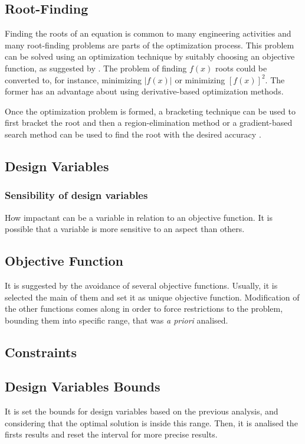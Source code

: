 \subsection{Root-Finding}
Finding the roots of an equation is common to many engineering activities and many root-finding problems are parts of the optimization process. This problem can be solved using an optimization technique by suitably choosing an objective function, as suggested by \cite{Deb2012}. The problem of finding $f(x)$ roots could be converted to, for instance, minimizing $\left|f(x)\right|$ or minimizing $\left[f(x)\right]^2$. The former has an advantage about using derivative-based optimization methods.

Once the optimization problem is formed, a bracketing technique can be used to first bracket the root and then a region-elimination method or a gradient-based search method can be used to find the root with the desired accuracy \cite{Deb2012}.

\subsection{Design Variables}
\subsubsection{Sensibility of design variables}
How impactant can be a variable in relation to an objective function. It is possible that a variable is more sensitive to an aspect than others.

\subsection{Objective Function}
It is suggested by \cite{Deb2012} the avoidance of several objective functions. Usually, it is selected the main of them and set it as unique objective function. Modification of the other functions comes along in order to force restrictions to the problem, bounding them into specific range, that was \textit{a priori} analised.

\subsection{Constraints}

\subsection{Design Variables Bounds}
It is set the bounds for design variables based on the previous analysis, and considering that the optimal solution is inside this range. Then, it is analised the firsts results and reset the interval for more precise results.

